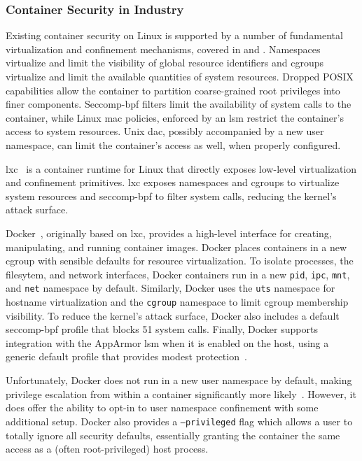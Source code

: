 \subsubsection{Container Security in Industry}%
\label{sss:container-security-industry}

Existing container security on Linux is supported by a number of fundamental
virtualization and confinement mechanisms, covered in  and
. Namespaces virtualize and limit the visibility of global
resource identifiers and cgroups virtualize and limit the available quantities of system
resources. Dropped POSIX capabilities allow the container to partition coarse-grained root
privileges into finer components. Seccomp-bpf filters limit the availability of system
calls to the container, while Linux \gls{mac} policies, enforced by an \gls{lsm} restrict
the container's access to system resources. Unix \gls{dac}, possibly accompanied by a new
user namespace, can limit the container's access as well, when properly configured.

\gls{lxc}~ is a container runtime for Linux that directly exposes low-level
virtualization and confinement primitives. \gls{lxc} exposes namespaces and cgroups to
virtualize system resources and seccomp-bpf to filter system calls, reducing the kernel's
attack surface.

Docker~\cite{docker_security, bui2015_docker_analysis, combe2016_to_docker}, originally
based on \gls{lxc}, provides a high-level interface for creating, manipulating, and
running container images. Docker places containers in a new cgroup with sensible defaults
for resource virtualization. To isolate processes, the filesytem, and network interfaces,
Docker containers run in a new \texttt{pid}, \texttt{ipc}, \texttt{mnt}, and \texttt{net}
namespace by default.  Similarly, Docker uses the \texttt{uts} namespace for hostname
virtualization and the \texttt{cgroup} namespace to limit cgroup membership visibility. To
reduce the kernel's attack surface, Docker also includes a default seccomp-bpf profile
that blocks 51 system calls. Finally, Docker supports integration with the AppArmor
\gls{lsm} when it is enabled on the host, using a generic default profile that provides
modest protection~\cite{docker_apparmor, docker_default_apparmor}.

Unfortunately, Docker does not run in a new user namespace by default, making privilege
escalation from within a container significantly more likely~\cite{docker_security}.
However, it does offer the ability to opt-in to user namespace confinement with some
additional setup.  Docker also provides a \texttt{--privileged} flag which allows a user
to totally ignore all security defaults, essentially granting the container the same
access as a (often root-privileged) host process.

